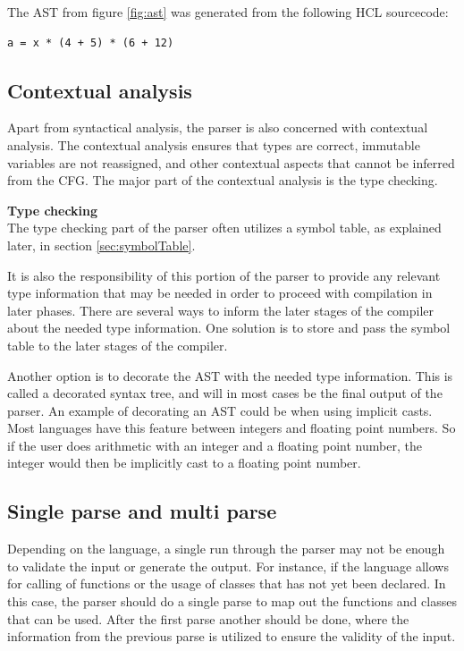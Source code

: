 The AST from figure \ref{fig:ast} was generated from the following HCL sourcecode:
\begin{lstlisting}[language=HCL,label=lis:typedcls,firstnumber=1]
a = x * (4 + 5) * (6 + 12)
\end{lstlisting}


\subsection{Contextual analysis}
Apart from syntactical analysis, the parser is also concerned with contextual analysis. 
The contextual analysis ensures that types are correct, immutable variables are not reassigned, and other contextual aspects that cannot be inferred from the CFG.
The major part of the contextual analysis is the type checking.

\textbf{Type checking}\\
The type checking part of the parser often utilizes a symbol table, as explained later, in section \ref{sec:symbolTable}.

It is also the responsibility of this portion of the parser to provide any relevant type information that may be needed in order to proceed with compilation in later phases. 
There are several ways to inform the later stages of the compiler about the needed type information. 
One solution is to store and pass the symbol table to the later stages of the compiler. 

Another option is to decorate the AST with the needed type information. 
This is called a decorated syntax tree, and will in most cases be the final output of the parser.
An example of decorating an AST could be when using implicit casts. 
Most languages have this feature between integers and floating point numbers. 
So if the user does arithmetic with an integer and a floating point number, the integer would then be implicitly cast to a floating point number.

\subsection{Single parse and multi parse}
Depending on the language, a single run through the parser may not be enough to validate the input or generate the output. 
For instance, if the language allows for calling of functions or the usage of classes that has not yet been declared.
In this case, the parser should do a single parse to map out the functions and classes that can be used. 
After the first parse another should be done, where the information from the previous parse is utilized to ensure the validity of the input. 

